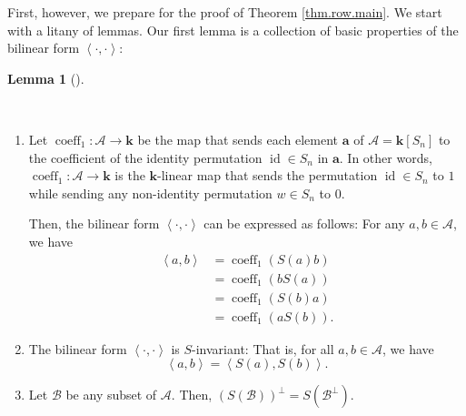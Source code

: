 \documentclass[numbers=enddot,12pt,final,onecolumn,notitlepage]{scrartcl}%
\numberwithin{exer}{subsection}
\theoremstyle{definition}
\newtheorem{lem}[theo]{Lemma}
\newenvironment{lemma}[1][]
{\begin{lem}[#1]\begin{leftbar}}
{\end{leftbar}\end{lem}}
\begin{document}
First, however, we prepare for the proof of Theorem \ref{thm.row.main}. We
start with a litany of lemmas. Our first lemma is a collection of basic
properties of the bilinear form $\left\langle \cdot,\cdot\right\rangle $:

\begin{lemma}
\label{lem.coeff1-form}\ \ 

\begin{enumerate}
\item[\textbf{(a)}] Let $\operatorname*{coeff}\nolimits_{1}:\mathcal{A}%
\rightarrow\mathbf{k}$ be the map that sends each element $\mathbf{a}$ of
$\mathcal{A}=\mathbf{k}\left[  S_{n}\right]  $ to the coefficient of the
identity permutation $\operatorname*{id}\in S_{n}$ in $\mathbf{a}$. In other
words, $\operatorname*{coeff}\nolimits_{1}:\mathcal{A}\rightarrow\mathbf{k}$
is the $\mathbf{k}$-linear map that sends the permutation $\operatorname*{id}%
\in S_{n}$ to $1$ while sending any non-identity permutation $w\in S_{n}$ to
$0$.

Then, the bilinear form $\left\langle \cdot,\cdot\right\rangle $ can be
expressed as follows: For any $a,b\in\mathcal{A}$, we have
\begin{align}
\left\langle a,b\right\rangle  &  =\operatorname*{coeff}\nolimits_{1}\left(
S\left(  a\right)  b\right) \label{pf.lem.row.LAnn.scalp.Sab}\\
&  =\operatorname*{coeff}\nolimits_{1}\left(  bS\left(  a\right)  \right)
\label{pf.lem.row.LAnn.scalp.bSa}\\
&  =\operatorname*{coeff}\nolimits_{1}\left(  S\left(  b\right)  a\right)
\label{pf.lem.row.LAnn.scalp.Sba}\\
&  =\operatorname*{coeff}\nolimits_{1}\left(  aS\left(  b\right)  \right)  .
\label{pf.lem.row.LAnn.scalp.aSb}%
\end{align}


\item[\textbf{(b)}] The bilinear form $\left\langle \cdot,\cdot\right\rangle $
is $S$-invariant: That is, for all $a,b\in\mathcal{A}$, we have%
\begin{equation}
\left\langle a,b\right\rangle =\left\langle S\left(  a\right)  ,S\left(
b\right)  \right\rangle . \label{eq.lem.coeff1-form.b.1}%
\end{equation}


\item[\textbf{(c)}] Let $\mathcal{B}$ be any subset of $\mathcal{A}$. Then,
$\left(  S\left(  \mathcal{B}\right)  \right)  ^{\perp}=S\left(
\mathcal{B}^{\perp}\right)  $.
\end{enumerate}
\end{lemma}
\end{document}

